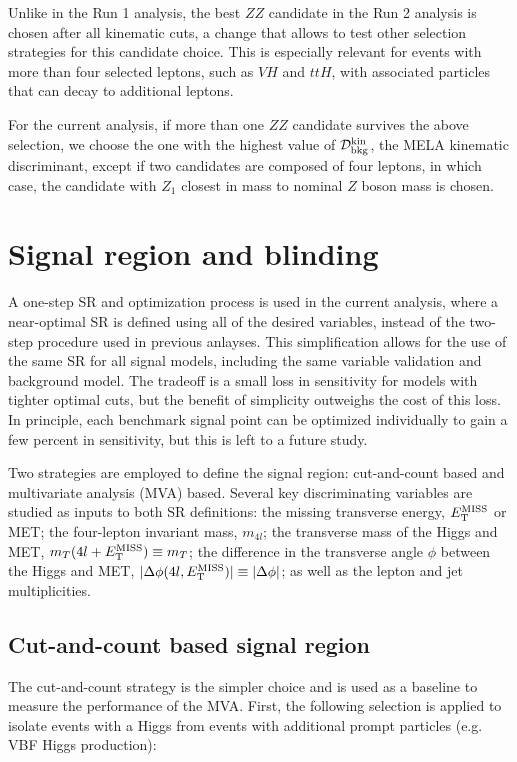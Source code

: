 Unlike in the Run 1 analysis, the best $ZZ$ candidate in the Run 2 analysis is chosen after all kinematic cuts, a change that allows to test other selection strategies for this candidate choice. 
This is especially relevant for events with more than four selected leptons, such as $VH$ and $ttH$, with associated particles that can decay to additional leptons.

For the current analysis, if more than one $ZZ$ candidate survives the above selection,
we choose the one with the highest value of $\KD$, the MELA kinematic discriminant, except if
two candidates are composed of four leptons, in which case, the candidate with $Z_1$ closest in mass to nominal 
$Z$ boson mass is chosen.


\section{Signal region and blinding}

A one-step SR and optimization process is used in the current analysis, where a near-optimal SR is defined using all of the desired variables, instead of the two-step procedure used in previous anlayses. This simplification allows for the use of the same SR for all signal models, including the same variable validation and background model. The tradeoff is a small loss in sensitivity for models with tighter optimal cuts, but the benefit of simplicity outweighs the cost of this loss. In principle, each benchmark signal point can be optimized individually to gain a few percent in sensitivity, but this is left to a future study.

Two strategies are employed to define the signal region: cut-and-count based and multivariate analysis (MVA) based. Several key discriminating variables are studied as inputs to both SR definitions: the missing transverse energy, $E_{\rm{T}}^{\rm{MISS}}$ or MET; the four-lepton invariant mass, $m_{4l}$; the transverse mass of the Higgs and MET, $m_T(4l+E_{\rm{T}}^{\rm{MISS}}) \equiv m_T$; the difference in the transverse angle $\phi$ between the Higgs and MET, $|\Delta\phi(4l, E_{\rm{T}}^{\rm{MISS}})| \equiv |\Delta\phi|$; as well as the lepton and jet multiplicities.

\subsection{Cut-and-count based signal region} \label{cutandcountopt}

The cut-and-count strategy is the simpler choice and is used as a baseline to measure the performance of the MVA. First, the following selection is applied to isolate events with a Higgs from events with additional prompt particles (e.g. VBF Higgs production):

